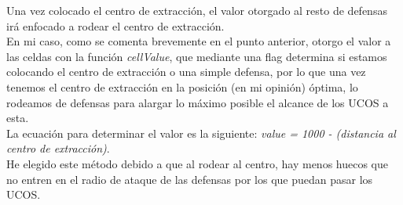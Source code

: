 Una vez colocado el centro de extracción, el valor otorgado al resto de defensas 
irá enfocado a rodear el centro de extracción.
\\
En mi caso, como se comenta brevemente en el punto anterior, otorgo el valor a las celdas con la función \textit{cellValue}, que 
mediante una flag determina si estamos colocando el centro de extracción o una simple defensa, 
por lo que una vez tenemos el centro de extracción en la posición (en mi  opinión) óptima, lo rodeamos de 
defensas para alargar lo máximo posible el alcance de los UCOS a esta.
\\
La ecuación para determinar el valor es la siguiente: \textit{value = 1000 - (distancia al centro de extracción)}.
\\
He elegido este método debido a que al rodear al centro, hay menos huecos que no entren en el radio de ataque de las defensas por los que puedan pasar los UCOS.
